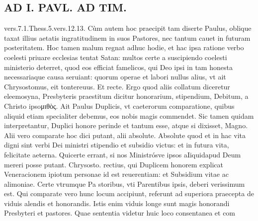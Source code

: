 \documentclass{article}
\begin{document}
\begin{pages}
\section*{AD I. PAVL. AD TIM. }
\marginpar{[ p.306 ]}\pstart vers.7.1.Thess.5.vers.12.13.  \pend\pstart Cùm autem hoc praecipit tam diserte Paulus, oblique taxat illius aetatis ingratitudinem in suos Pastores, nec tantum cauet in futuram posteritatem. Hoc tamen malum regnat adhuc hodie, et hac ipsa ratione verbo coelesti priuare ecclesias tentat Satan: multos certe a suscipiendo coelesti ministerio deterret, quod eos efficiat famelicos, qui Deo ipsi in tam honesta necessariaque causa seruiant: quorum operae et labori nullus alius, vt ait Chrysostomus, eit tontereuus. Et recte. Ergo quod aliis collatum diceretur eleemosyna, Presbyteris praestitum dicitur honorarium, stipendium, Debitum, a Christo ipsoμιθὸς.  \pend\pstart Ait Paulus Duplicis, vt caeterorum comparatione, quibus aliquid etiam specialiter debemus, eos nobis magis commendet. Sic tamen quidam interpretantur, Duplici honore perinde et tantum esse, atque si dixisset, Magno. Alii vero comparate hoc dici putant, alii absolute. Absolute quod et in hac vita digni sint verbi Dei ministri stipendio et subsidio victus: et in futura vita, felicitate aeterna. Quicerte errant, si nos Ministrósve ipsos aIiquidapud Deum mereri posse putant. Chrysosto. rectius, qui Duplicem honorem explicat Veneracionem ipiotum personae id est reuerentiam: et Subsidium vitae ac alimoniae. Certe vtrumque Pa storibus, vti Parentibus ipsis, deberi verissimum est. Qui comparate vero hunc locum accipiunt, referunt ad superiora praecepta de viduis alendis et honorandis. Istis enim viduis longe sunt magis honorandi Presbyteri et pastores. Quae sententia videtur huic loco consentanea et com\pend

\end{pages}
\end{document}
